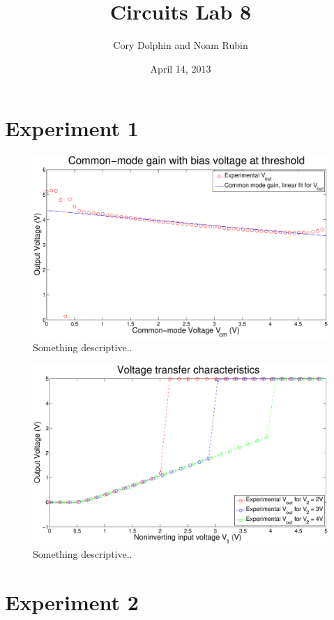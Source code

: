 \documentclass{article}
\title{Circuits Lab 8}
\author{Cory Dolphin and Noam Rubin}
\date{April 14, 2013}
\begin{document}
\maketitle

\section*{Experiment 1}

\begin{figure}[H]
\centering
\includegraphics[width=\linewidth]{../Figures/Exp1P1.eps}
\caption{Something descriptive..}
\label{fig:exp1p1}
\end{figure}

\begin{figure}[H]
\centering
\includegraphics[width=\linewidth]{../Figures/Exp1P2.eps}
\caption{Something descriptive..}
\label{fig:exp1p2}
\end{figure}

\section*{Experiment 2}
\end{document}
